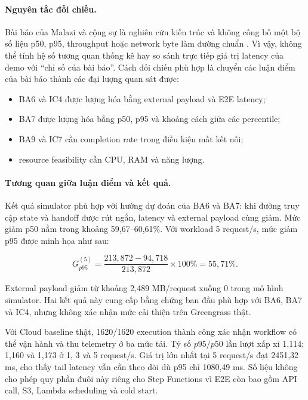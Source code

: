\paragraph{Nguyên tắc đối chiếu.}
Bài báo của Malazi và cộng sự là nghiên cứu kiến trúc và không công bố một bộ số
liệu p50, p95, throughput hoặc network byte làm đường chuẩn
\cite{malazi2026orchestrating}. Vì vậy, không thể tính hệ số tương quan thống kê hay
so sánh trực tiếp giá trị latency của demo với ``chỉ số của bài báo''. Cách đối
chiếu phù hợp là chuyển các luận điểm của bài báo thành các đại lượng quan sát được:

\begin{itemize}
    \item BA6 và IC4 được lượng hóa bằng external payload và E2E latency;
    \item BA7 được lượng hóa bằng p50, p95 và khoảng cách giữa các percentile;
    \item BA9 và IC7 cần completion rate trong điều kiện mất kết nối;
    \item resource feasibility cần CPU, RAM và năng lượng.
\end{itemize}

\paragraph{Tương quan giữa luận điểm và kết quả.}
Kết quả simulator phù hợp với hướng dự đoán của BA6 và BA7: khi đường truy cập
state và handoff được rút ngắn, latency và external payload cùng giảm. Mức giảm p50
nằm trong khoảng 59,67--60,61\%. Với workload 5 request/s, mức giảm p95 được minh
họa như sau:

\begin{equation}
G_{p95}^{(5)} = \frac{213{,}872 - 94{,}718}{213{,}872}\times 100\%
= 55{,}71\%.
\label{eq:p95-reduction}
\end{equation}

External payload giảm từ khoảng 2,489 MB/request xuống 0 trong mô hình simulator.
Hai kết quả này cung cấp bằng chứng ban đầu phù hợp với BA6, BA7 và IC4, nhưng
không xác nhận mức cải thiện trên Greengrass thật.

Với Cloud baseline thật, 1620/1620 execution thành công xác nhận workflow có thể
vận hành và thu telemetry ở ba mức tải. Tỷ số $p95/p50$ lần lượt xấp xỉ 1,114;
1,160 và 1,173 ở 1, 3 và 5 request/s. Giá trị lớn nhất tại 5 request/s đạt
2451,32 ms, cho thấy tail latency vẫn cần theo dõi dù p95 chỉ 1080,49 ms. Số liệu không
cho phép quy phần đuôi này riêng cho Step Functions vì E2E còn bao gồm API call,
S3, Lambda scheduling và cold start.

